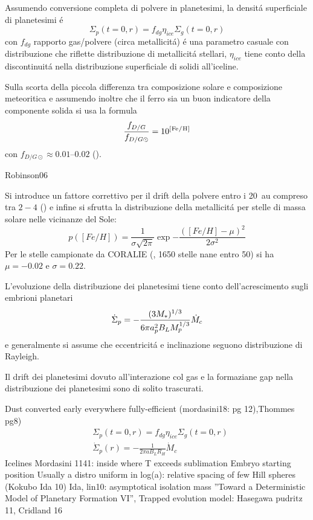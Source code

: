 Assumendo conversione completa di polvere in planetesimi, la densit\'a superficiale di planetesimi \'e
\begin{equation}
\Sigma_p(t=0,r)=f_{dg}\eta_{ice}\Sigma_g(t=0,r)
\end{equation}
con $f_{dg}$ rapporto gas/polvere (circa metallicit\'a) \'e una parametro casuale con distribuzione che riflette distribuzione di metallicit\'a stellari, $\eta_{ice}$ tiene conto della discontinuit\'a nella distribuzione superficiale di solidi all'iceline.

Sulla scorta della piccola differenza tra composizione solare e composizione meteoritica e assumendo inoltre che il ferro sia un buon indicatore della componente solida  si usa la formula
\begin{equation}
\frac{f_{D/G}}{f_{D/G\odot}}=10\expy{[\cel{Fe}{}{}{}/\cel{H}{}{}{}]}
\end{equation}
con $f_{D/G\odot}\approx\numrange{0.01}{0.02}$ (\cite{lodders2003solar}).

\begin{workout}
Robinson06
\end{workout}

Si introduce un fattore correttivo per il drift della polvere entro i \SI{20}{\astronomicalunit} compreso tra $2-4$ (\cite{kornet2004alternative}) e infine si sfrutta la distribuzione della metallicit\'a per stelle di massa solare nelle vicinanze del Sole:
\begin{equation}
p([Fe/H])=\frac{1}{\sigma\sqrt{2\pi}}\exp{-\frac{([Fe/H]-\mu)^2}{2\sigma^2}}
\end{equation}
Per le stelle campionate da CORALIE (\cite{udry2000coralie}, 1650 stelle nane entro \SI{50}{\parsec}) si ha $\mu=-0.02$ e $\sigma=0.22$.

L'evoluzione della distribuzione dei planetesimi tiene conto dell'acrescimento sugli embrioni planetari
\begin{equation}\dot{\Sigma}_p=-\frac{(3M_*)^{1/3}}{6\pi a_p^2B_LM_p^{1/3}}\dot{M}_c\end{equation}
e generalmente si assume che eccentricit\'a e inclinazione seguono distribuzione di Rayleigh.

Il drift dei planetesimi dovuto all'interazione col gas e la formaziane gap nella distribuzione dei planetesimi sono di solito trascurati.

\begin{workout}
Dust converted early everywhere fully-efficient (mordasini18: pg 12),Thommes pg8)
\begin{align*}
&\Sigma_p(t=0,r)=f_{dg}\eta_{ice}\Sigma_g(t=0,r)\\
&\dot{\Sigma}_p(r)=-\frac{1}{2\pi aB_LR_H}\dot{M}_c
\end{align*}
Icelines Mordasini 1141: inside where T exceeds sublimation
{Embryo starting position}
Usually a distro uniform in log(a): relative spacing of few Hill spheres (Kokubo Ida 10)
Ida, lin10: asymptotical isolation mass ''Toward a Deterministic Model of Planetary Formation VI'',
Trapped evolution model: Hasegawa pudritz 11, Cridland 16
\end{workout}

